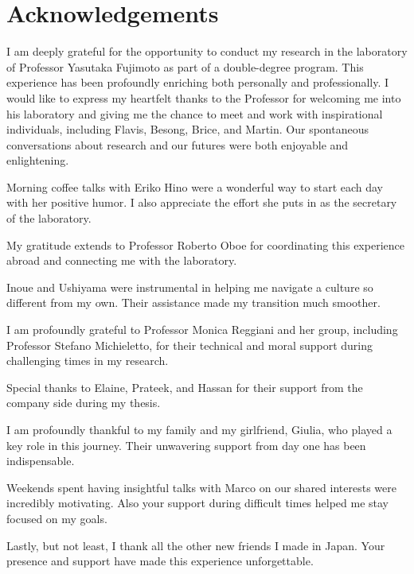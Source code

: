 \thispagestyle{empty}
\section*{Acknowledgements}
\vspace{0.5cm}
I am deeply grateful for the opportunity to conduct my research in the laboratory 
of Professor Yasutaka Fujimoto as part of a double-degree program. This experience 
has been profoundly enriching both personally and professionally. I would like 
to express my heartfelt thanks to the Professor for welcoming me into his laboratory and 
giving me the chance to meet and work with inspirational individuals, including 
Flavis, Besong, Brice, and Martin. Our spontaneous conversations about research 
and our futures were both enjoyable and enlightening.

Morning coffee talks with Eriko Hino were a wonderful way to start each day with 
her positive humor. I also appreciate the effort she puts in as the secretary of 
the laboratory.

My gratitude extends to Professor Roberto Oboe for coordinating this experience 
abroad and connecting me with the laboratory.

Inoue and Ushiyama were instrumental in helping me navigate a culture so different 
from my own. Their assistance made my transition much smoother.

I am profoundly grateful to Professor Monica Reggiani and her group, including 
Professor Stefano Michieletto, for their technical and moral support during 
challenging times in my research.

Special thanks to Elaine, Prateek, and Hassan for their support from the company 
side during my thesis.

I am profoundly thankful to my family and my girlfriend, Giulia, who played a 
key role in this journey. Their unwavering support from day one has been indispensable.

Weekends spent having insightful talks with Marco on our shared interests were 
incredibly motivating. Also your support during difficult times helped me stay 
focused on my goals.

Lastly, but not least, I thank all the other new friends I made in Japan. Your 
presence and support have made this experience unforgettable.
\afterpage{\blankpage}